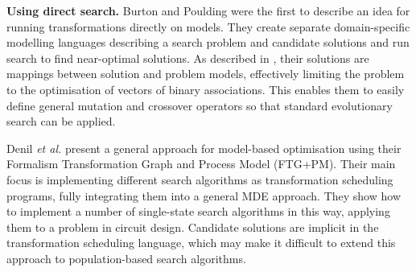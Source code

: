 	  \textbf{Using direct search.}
%
			Burton and Poulding \cite{BurtonPoulding13} were the first to describe an idea for running transformations directly on models. They create separate 
			domain-specific modelling languages describing a search problem and candidate solutions and run search to find near-optimal solutions. As described in 
			\cite{Burton+12}, their solutions are mappings between solution and problem models, effectively limiting the problem to the optimisation of vectors of
			binary associations. This enables them to easily define general mutation and crossover operators so that standard evolutionary search can be applied.
			
			Denil \emph{et al.} \cite{Denil+14} present a general approach for model-based optimisation using their Formalism Transformation Graph and Process Model 
			(FTG+PM). Their main focus is implementing different search algorithms as transformation scheduling programs, fully integrating them into a general MDE
			approach. They show how to implement a number of single-state search algorithms in this way, applying them to a problem in circuit design. Candidate
			solutions are implicit in the transformation scheduling language, which may make it difficult to extend this approach to population-based search algorithms.